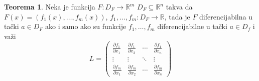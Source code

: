 \documentclass[11pt]{article}
\theoremstyle{definition}
\newtheorem{teorema}[definicija]{Teorema}
\theoremstyle{serbnodot}
\begin{document}
\begin{teorema}
    Neka je funkcija \(F: D_F \to \mathbb{R}^m\) \(D_F \subseteq \mathbb{R}^n\) takva da
    \(F(x) = (f_1(x), \dots, f_m(x))\), \(f_1, \dots, f_m : D_F \to \mathbb{R}\), tada je
    \(F\) diferencijabilna u tački \(a \in D_F\) ako i samo ako su funkcije 
    \(f_1, \dots, f_m\) diferencijabilne u tački \(a \in D_f\) i važi
    \[
        L =
        \begin{pmatrix}
        \frac{\partial f_1}{\partial x_1} & \frac{\partial f_1}{\partial x_2} & \cdots & \frac{\partial f_1}{\partial x_n} \\
        \vdots & \vdots & \ddots & \vdots \\
        \frac{\partial f_m}{\partial x_1} & \frac{\partial f_m}{\partial x_2} & \cdots & \frac{\partial f_m}{\partial x_n}
        \end{pmatrix} 
    \]
\end{teorema}
\end{document}
